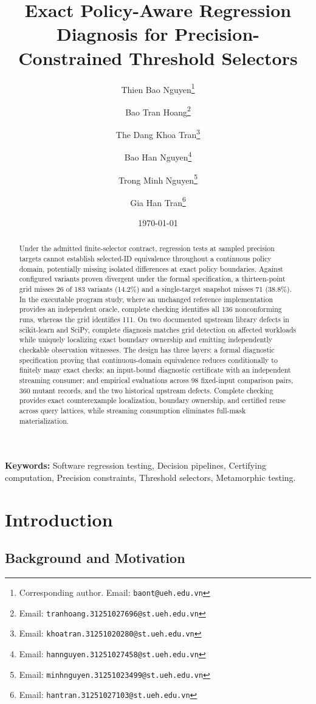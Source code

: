 \documentclass[11pt,a4paper]{article}
\title{\textbf{Exact Policy-Aware Regression Diagnosis for Precision-Constrained Threshold Selectors}}
\author[1]{Thien Bao Nguyen\thanks{Corresponding author. Email: \texttt{baont@ueh.edu.vn}}}
\author[1]{Bao Tran Hoang\thanks{Email: \texttt{tranhoang.31251027696@st.ueh.edu.vn}}}
\author[1]{The Dang Khoa Tran\thanks{Email: \texttt{khoatran.31251020280@st.ueh.edu.vn}}}
\author[1]{Bao Han Nguyen\thanks{Email: \texttt{hannguyen.31251027458@st.ueh.edu.vn}}}
\author[1]{Trong Minh Nguyen\thanks{Email: \texttt{minhnguyen.31251023499@st.ueh.edu.vn}}}
\author[1]{Gia Han Tran\thanks{Email: \texttt{hantran.31251027103@st.ueh.edu.vn}}}
\affil[1]{Institute of Intelligent and Interactive Technologies (3i Institute),
College of Technology and Design (CTD),
University of Economics Ho Chi Minh City (UEH),
Ho Chi Minh City, Vietnam}
\date{\today}
\begin{document}
\maketitle

\begin{abstract}
Under the admitted finite-selector contract, regression tests at sampled precision targets cannot establish selected-ID equivalence throughout a continuous policy domain, potentially missing isolated differences at exact policy boundaries. Against configured variants proven divergent under the formal specification, a thirteen-point grid misses 26 of 183 variants (14.2\%) and a single-target snapshot misses 71 (38.8\%). In the executable program study, where an unchanged reference implementation provides an independent oracle, complete checking identifies all 136 nonconforming runs, whereas the grid identifies 111. On two documented upstream library defects in scikit-learn and SciPy, complete diagnosis matches grid detection on affected workloads while uniquely localizing exact boundary ownership and emitting independently checkable observation witnesses. The design has three layers: a formal diagnostic specification proving that continuous-domain equivalence reduces conditionally to finitely many exact checks; an input-bound diagnostic certificate with an independent streaming consumer; and empirical evaluations across 98 fixed-input comparison pairs, 360 mutant records, and the two historical upstream defects. Complete checking provides exact counterexample localization, boundary ownership, and certified reuse across query lattices, while streaming consumption eliminates full-mask materialization.
\end{abstract}

\vspace{0.5em}
\noindent\textbf{Keywords:} Software regression testing, Decision pipelines, Certifying computation, Precision constraints, Threshold selectors, Metamorphic testing.

\vspace{1em}

\section{Introduction}\label{sec:introduction}


\subsection{Background and Motivation}
\end{document}

